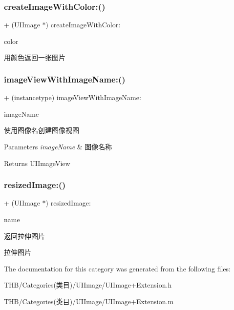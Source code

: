 \subsubsection{\texorpdfstring{create\+Image\+With\+Color\+:()}{createImageWithColor:()}}
{\footnotesize\ttfamily + (U\+I\+Image $\ast$) create\+Image\+With\+Color\+: \begin{DoxyParamCaption}\item[{(U\+I\+Color$\ast$)}]{color }\end{DoxyParamCaption}}

用颜色返回一张图片 \mbox{\label{category_u_i_image_07_extension_08_a274f190ca2b3c27f98183412c8b25d95}} 
\subsubsection{\texorpdfstring{image\+View\+With\+Image\+Name\+:()}{imageViewWithImageName:()}}
{\footnotesize\ttfamily + (instancetype) image\+View\+With\+Image\+Name\+: \begin{DoxyParamCaption}\item[{(N\+S\+String $\ast$)}]{image\+Name }\end{DoxyParamCaption}}

使用图像名创建图像视图


\begin{DoxyParams}{Parameters}
{\em image\+Name} & 图像名称\\
\hline
\end{DoxyParams}
\begin{DoxyReturn}{Returns}
U\+I\+Image\+View 
\end{DoxyReturn}
\mbox{\label{category_u_i_image_07_extension_08_a66ae92ad504bc54225e9968cdcce6359}} 
\subsubsection{\texorpdfstring{resized\+Image\+:()}{resizedImage:()}}
{\footnotesize\ttfamily + (U\+I\+Image $\ast$) resized\+Image\+: \begin{DoxyParamCaption}\item[{(N\+S\+String $\ast$)}]{name }\end{DoxyParamCaption}}

返回拉伸图片

拉伸图片 

The documentation for this category was generated from the following files\+:\begin{DoxyCompactItemize}
\item 
T\+H\+B/\+Categories(类目)/\+U\+I\+Image/U\+I\+Image+\+Extension.\+h\item 
T\+H\+B/\+Categories(类目)/\+U\+I\+Image/U\+I\+Image+\+Extension.\+m\end{DoxyCompactItemize}
